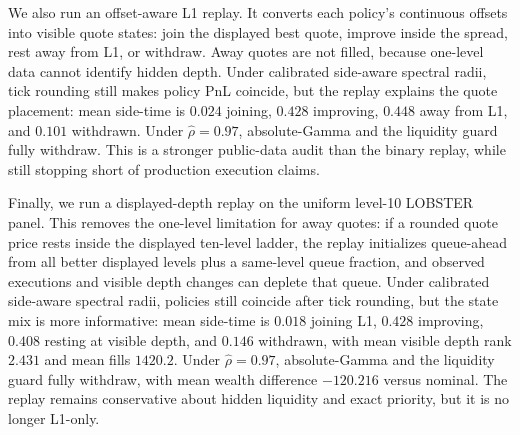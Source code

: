 \documentclass[review]{siamonline250211}
\begin{document}
We also run an offset-aware L1 replay. It converts each policy's continuous
offsets into visible quote states: join the displayed best quote, improve
inside the spread, rest away from L1, or withdraw. Away quotes are not filled,
because one-level data cannot identify hidden depth. Under calibrated
side-aware spectral radii, tick rounding still makes policy PnL coincide, but
the replay explains the quote placement: mean side-time is $0.024$ joining,
$0.428$ improving, $0.448$ away from L1, and $0.101$ withdrawn. Under
$\hat\rho=0.97$, absolute-Gamma and the liquidity guard fully withdraw. This
is a stronger public-data audit than the binary replay, while still stopping
short of production execution claims.

Finally, we run a displayed-depth replay on the uniform level-10 LOBSTER panel.
This removes the one-level limitation for away quotes: if a rounded quote price
rests inside the displayed ten-level ladder, the replay initializes queue-ahead
from all better displayed levels plus a same-level queue fraction, and observed
executions and visible depth changes can deplete that queue. Under calibrated
side-aware spectral radii, policies still coincide after tick rounding, but the
state mix is more informative: mean side-time is $0.018$ joining L1, $0.428$
improving, $0.408$ resting at visible depth, and $0.146$ withdrawn, with mean
visible depth rank $2.431$ and mean fills $1420.2$. Under $\hat\rho=0.97$,
absolute-Gamma and the liquidity guard fully withdraw, with mean wealth
difference $-120.216$ versus nominal. The replay remains conservative about
hidden liquidity and exact priority, but it is no longer L1-only.
\end{document}
